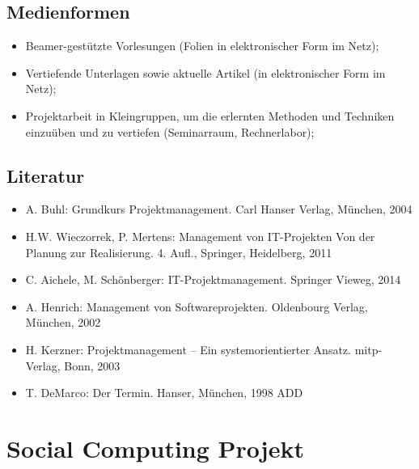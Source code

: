 \hypertarget{medienformenpathlabelmi-2017modulbeschreibungen-bachelorba_projektmanagement}{%
\section*{Medienformen\label{/mi-2017/modulbeschreibungen-bachelor/BA_Projektmanagement}}\label{medienformenpathlabelmi-2017modulbeschreibungen-bachelorba_projektmanagement}}

\begin{itemize}
\tightlist
\item
  Beamer-gestützte Vorlesungen (Folien in elektronischer Form im Netz);
\item
  Vertiefende Unterlagen sowie aktuelle Artikel (in elektronischer Form
  im Netz);
\item
  Projektarbeit in Kleingruppen, um die erlernten Methoden und Techniken
  einzuüben und zu vertiefen (Seminarraum, Rechnerlabor);
\end{itemize}

\hypertarget{literaturpathlabelmi-2017modulbeschreibungen-bachelorba_projektmanagement}{%
\section*{Literatur\label{/mi-2017/modulbeschreibungen-bachelor/BA_Projektmanagement}}\label{literaturpathlabelmi-2017modulbeschreibungen-bachelorba_projektmanagement}}

\begin{itemize}
\tightlist
\item
  A. Buhl: Grundkurs Projektmanagement. Carl Hanser Verlag, München,
  2004
\item
  H.W. Wieczorrek, P. Mertens: Management von IT-Projekten Von der
  Planung zur Realisierung. 4. Aufl., Springer, Heidelberg, 2011
\item
  C. Aichele, M. Schönberger: IT-Projektmanagement. Springer Vieweg,
  2014
\item
  A. Henrich: Management von Softwareprojekten. Oldenbourg Verlag,
  München, 2002
\item
  H. Kerzner: Projektmanagement -- Ein systemorientierter Ansatz.
  mitp-Verlag, Bonn, 2003
\item
  T. DeMarco: Der Termin. Hanser, München, 1998 ADD
\end{itemize}

\hypertarget{social-computing-projektpathlabelmi-2017modulbeschreibungen-bachelorba_sc_projekt}{%
\chapter{Social Computing
Projekt\label{/mi-2017/modulbeschreibungen-bachelor/BA_SC_Projekt}}\label{social-computing-projektpathlabelmi-2017modulbeschreibungen-bachelorba_sc_projekt}}

